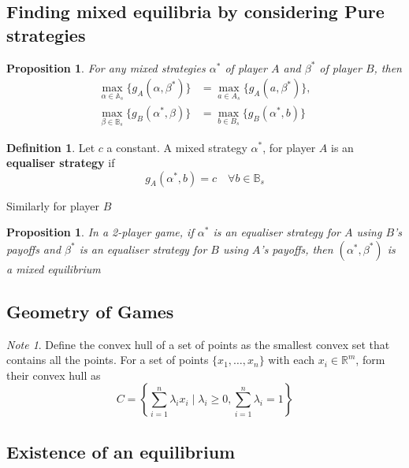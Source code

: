 \documentclass[11pt]{article}
\theoremstyle{plain}
\newtheorem{proposition}[theorem]{Proposition}
\theoremstyle{definition}
\newtheorem{definition}[theorem]{Definition}
\theoremstyle{remark}
\newtheorem*{note}{Note}
\newcommand{\R}{\mathbb{R}}
\begin{document}
\setcounter{subsection}{2} 
\subsection{Finding mixed equilibria by considering Pure strategies}

\begin{proposition}
    For any mixed strategies \(\alpha^{\ast}\) of player \(A\) and \(\beta^{\ast} \) of player \(B\), then
    \begin{align*}
        \mathop{\max}_{\alpha \in \mathbb{A}_{s}}\{ g_{A}(\alpha,\beta^{\ast})\} &= \mathop{\max}_{a \in A_{s}}\{ g_{A}(a,\beta^{\ast})\},\\
        \mathop{\max}_{\beta \in \mathbb{B}_{s}}\{ g_{B}(\alpha^{\ast},\beta)\} &= \mathop{\max}_{b \in B_{s}}\{ g_{B}(\alpha^{\ast},b)\}
    \end{align*}
\end{proposition}


\begin{definition}
    Let \(c\) a constant. A mixed strategy \(\alpha^{\ast} \), for player \(A\) is an \textbf{equaliser strategy} if
    \[
        g_{A}(\alpha^{\ast},b) = c \quad \forall b \in \mathbb{B}_{s}  
    \]

    Similarly for player \(B\) 
\end{definition}

\begin{proposition}
    In a 2-player game, if \(\alpha^{\ast} \) is an equaliser strategy for \(A\) using \(B\)'s payoffs and \(\beta^{\ast} \) is an equaliser strategy for \(B\) using \(A\)'s payoffs, then \((\alpha^{\ast},\beta^{\ast}) \) is a mixed equilibrium
\end{proposition}

\subsection{Geometry of Games}

\begin{note}
    Define the convex hull of a set of points as the smallest convex set that contains all the points.
    For a set of points \(\{x_1, \ldots, x_{n} \}\) with each \(x_{i} \in \R^m\), form their convex hull as
    \[
        C = \left\{ \sum_{i=1}^{n} \lambda_{i} x_{i} \mid \lambda_{i} \geq 0, \sum_{i=1}^{n} \lambda_{i} = 1 \right\}
    \]
\end{note}

\subsection{Existence of an equilibrium}
\end{document}
